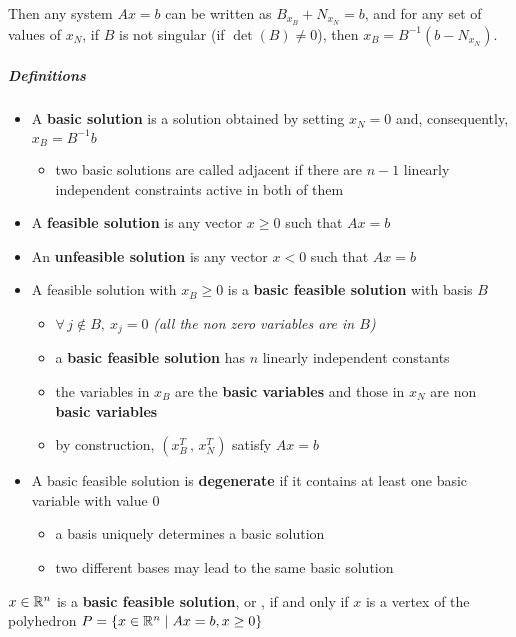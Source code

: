 \documentclass[english]{article}
\begin{document}
Then any system \(Ax = b\) can be written as \(B _{x_B} + N_{x_N} = b\), and for any set of values of \(x_N\), if \(B\) is not singular (if \(\det(B) \neq 0\)), then \(x_B = B^{-1} (b - N_{x_N})\).

\subparagraph*{Definitions}
\begin{itemize}
  \item A \textbf{basic solution} is a solution obtained by setting \(x_N = 0\) and, consequently, \(x_B = B^{-1} b\)
        \begin{itemize}
          \item two basic solutions are called adjacent if there are \(n-1\) linearly independent constraints active in both of them
        \end{itemize}
  \item A \textbf{feasible solution} is any vector \(x \geq 0\) such that \(Ax = b\)
  \item An \textbf{unfeasible solution} is any vector \(x < 0\) such that \(Ax = b\)
  \item A feasible solution with \(x_B \geq 0\) is a \textbf{basic feasible solution} with basis \(B\)
        \begin{itemize}
          \item \(\forall \, j \notin B, \ x_j = 0\) \textit{(all the non zero variables are in \(B\))}
          \item a \textbf{basic feasible solution} has \(n\) linearly independent constants
          \item the variables in \(x_B\) are the \textbf{basic variables} and those in \(x_N\) are non \textbf{basic variables}
          \item by construction, \(\left( x_B^T \, , \, x_N^T \right)\) satisfy \(Ax = b\)
        \end{itemize}
  \item A basic feasible solution is \textbf{degenerate} if it contains at least one basic variable with value \(0\)
        \begin{itemize}
          \item a basis uniquely determines a basic solution
          \item two different bases may lead to the same basic solution
        \end{itemize}
\end{itemize}

\begin{theorem}
  \(x \in \mathbb{R}^n\) is a \textbf{basic feasible solution}, or \BFS, if and only if \(x\) is a vertex of the polyhedron \(P = \left\{ x \in \mathbb{R}^n \mid   Ax = b, x \geq 0 \right\}\)
\end{theorem}
\end{document}

